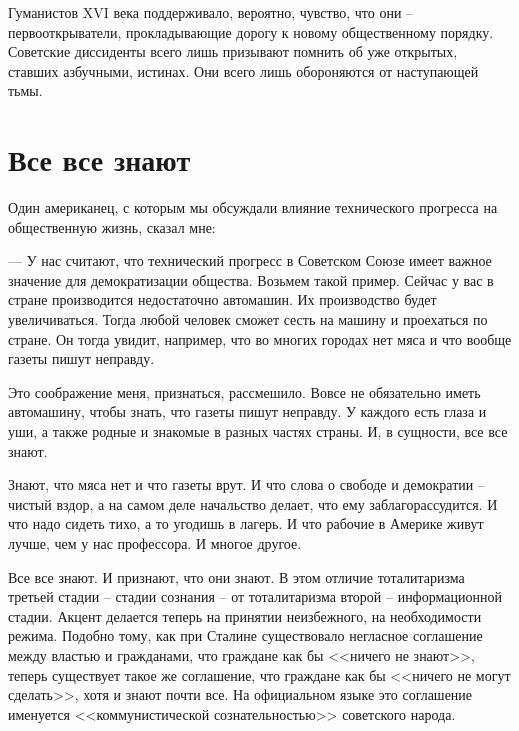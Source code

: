 \documentclass{book}
\begin{document}
Гуманистов XVI века поддерживало, вероятно, чувство, что они -- первооткрыватели, прокладывающие дорогу к ново­му общественному порядку. Советские диссиденты всего лишь призывают помнить об уже открытых, ставших азбучными, истинах. Они всего лишь обороняются от наступающей тьмы.


\section{Все все знают}

Один американец, с которым мы обсуждали влияние технического прогресса на общественную жизнь, сказал мне:

--- У нас считают, что технический прогресс в Советском Союзе имеет важное значение для демократизации общества. Возьмем такой пример. Сейчас у вас в стране производится недостаточно автомашин. Их производство будет увеличиваться. Тогда любой человек сможет сесть на машину и проехаться по стране. Он тогда увидит, например, что во многих городах нет мяса и что вообще газеты пишут неправду.

Это соображение меня, признаться, рассмешило. Вовсе не обязательно иметь автомашину, чтобы знать, что газеты пишут неправду. У каждого есть глаза и уши, а также родные и знакомые в разных частях страны. И, в сущности, все все знают.

Знают, что мяса нет и что газеты врут. И что слова о свободе и демократии -- чистый вздор, а на самом деле начальство делает, что ему заблагорассудится. И что надо сидеть тихо, а то угодишь в лагерь. И что рабочие в Америке живут лучше, чем у нас профессора. И многое другое.

Все все знают. И признают, что они знают. В этом отличие тоталитаризма третьей стадии -- стадии сознания -- от тоталитаризма второй -- информационной стадии. Акцент делается теперь на принятии неизбежного, на необходимости режима. Подобно тому, как при Сталине существовало негласное соглашение между властью и гражданами, что граждане как бы <<ничего не знают>>, теперь существует такое же соглашение, что граждане как бы <<ничего не могут сделать>>, хотя и знают почти все. На официальном языке это соглашение именуется <<комму­нистической сознательностью>> советского народа.
\end{document}
